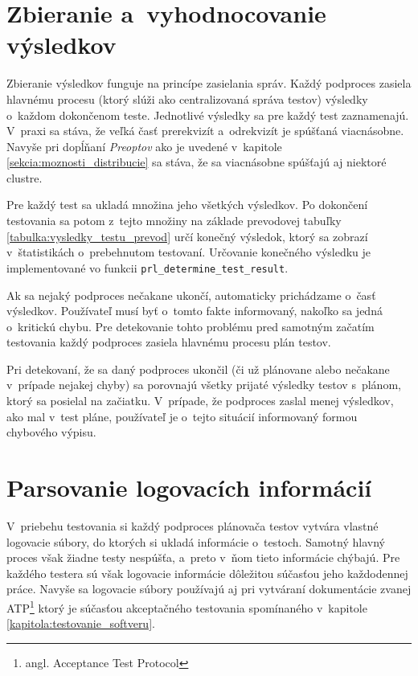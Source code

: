 \section{Zbieranie a~vyhodnocovanie výsledkov}
\label{sekcia:zbieranie_vysledkov}
Zbieranie výsledkov funguje na princípe zasielania správ. 
Každý podproces zasiela hlavnému procesu (ktorý slúži ako centralizovaná
správa testov) výsledky o~každom dokončenom teste. Jednotlivé výsledky sa
pre každý test zaznamenajú. V~praxi sa stáva, že veľká časť prerekvizít
a~odrekvizít je spúšťaná viacnásobne. Navyše pri dopĺňaní \textit{Preoptov}
ako je uvedené v~kapitole \ref{sekcia:moznosti_distribucie} sa stáva, 
že sa viacnásobne spúšťajú aj niektoré clustre. 

Pre každý test sa ukladá množina jeho všetkých výsledkov. 
Po dokončení testovania sa potom z~tejto množiny na základe prevodovej
tabuľky \ref{tabulka:vysledky_testu_prevod} určí konečný výsledok,
ktorý sa zobrazí v~štatistikách o~prebehnutom testovaní.
Určovanie konečného výsledku je implementované vo funkcii 
\texttt{prl\_determine\_test\_result}.

Ak sa nejaký podproces nečakane ukončí, automaticky prichádzame 
o~časť výsledkov. Používateľ musí byť o~tomto fakte informovaný, 
nakoľko sa jedná o~kritickú chybu. Pre detekovanie tohto problému pred 
samotným začatím testovania každý podproces zasiela hlavnému procesu 
plán testov.

Pri detekovaní, že sa daný podproces ukončil (či už plánovane alebo 
nečakane v~prípade nejakej chyby) sa porovnajú všetky prijaté výsledky 
testov s~plánom, ktorý sa posielal na začiatku. V~prípade, že podproces 
zaslal menej výsledkov, ako mal v~test pláne, používateľ je o~tejto 
situácií informovaný formou chybového výpisu. 

\section{Parsovanie logovacích informácií}
\label{sekcia:parsovanie_logov}
V~priebehu testovania si každý podproces plánovača testov vytvára vlastné
logovacie súbory, do ktorých si ukladá informácie o~testoch.
Samotný hlavný proces však žiadne testy nespúšťa, a~preto v~ňom tieto 
informácie chýbajú. Pre každého testera sú však logovacie informácie 
dôležitou súčasťou jeho každodennej práce. Navyše sa logovacie súbory 
používajú aj pri vytváraní dokumentácie zvanej 
ATP\footnote{angl. Acceptance Test Protocol} ktorý je súčasťou
akceptačného testovania spomínaného v~kapitole 
\ref{kapitola:testovanie_softveru}.

